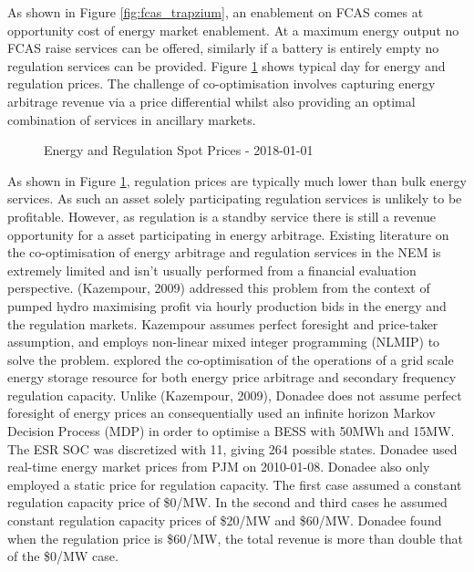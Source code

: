 As shown in Figure \ref{fig:fcas_trapzium}, an enablement on FCAS comes at opportunity cost of energy market enablement. At a maximum energy output no FCAS raise services can be offered, similarly if a battery is entirely empty no regulation services can be provided. Figure \ref{fig:energy_and_reg} shows typical day for energy and regulation prices. The challenge of co-optimisation involves capturing energy arbitrage revenue via a price differential whilst also providing an optimal combination of services in ancillary markets.
\begin{figure}[H]
    \centering
    \caption{Energy and Regulation Spot Prices - 2018-01-01}
    \label{fig:energy_and_reg}
\end{figure}
As shown in Figure \ref{fig:energy_and_reg}, regulation prices are typically much lower than bulk energy services. As such an asset solely participating regulation services is unlikely to be profitable. However, as regulation is a standby service there is still a revenue opportunity for a asset participating in energy arbitrage.
\newline
\newline
Existing literature on the co-optimisation of energy arbitrage and regulation services in the NEM is extremely limited and isn't usually performed from a financial evaluation perspective. 
(Kazempour, 2009) addressed this problem from the context of pumped hydro maximising profit via hourly production bids in the energy and the regulation markets. Kazempour assumes perfect foresight and price-taker assumption, and employs non-linear mixed integer programming (NLMIP) to solve the problem. 
\newline 
\newline 
\parencite{Donadee} explored the co-optimisation of the operations of a grid scale energy storage resource for both energy price arbitrage and secondary frequency regulation capacity. Unlike (Kazempour, 2009), Donadee does not assume perfect foresight of energy prices an consequentially used an infinite horizon Markov Decision Process  (MDP) in order to optimise a BESS with 50MWh and 15MW.  The ESR SOC was discretized with 11, giving 264 possible states. Donadee used real-time energy market prices from PJM on 2010-01-08. Donadee also only employed a static price for regulation capacity. The first case assumed a constant regulation capacity price of \$0/MW. In the second and third cases he assumed constant regulation capacity prices of \$20/MW and \$60/MW. Donadee found when the regulation price is \$60/MW, the total revenue is more than double that of the \$0/MW case. 
